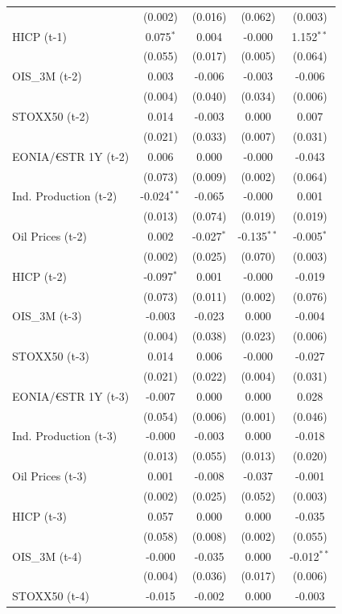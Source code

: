\begin{longtable}[t]{lcccc}
 & (0.002) & (0.016) & (0.062) & (0.003)\\
HICP (t-1) & 0.075$^{*}$ & 0.004 & -0.000 & 1.152$^{**}$\\
 & (0.055) & (0.017) & (0.005) & (0.064)\\
OIS\_3M (t-2) & 0.003 & -0.006 & -0.003 & -0.006\\
 & (0.004) & (0.040) & (0.034) & (0.006)\\
STOXX50 (t-2) & 0.014 & -0.003 & 0.000 & 0.007\\
 & (0.021) & (0.033) & (0.007) & (0.031)\\
EONIA/€STR 1Y (t-2) & 0.006 & 0.000 & -0.000 & -0.043\\
 & (0.073) & (0.009) & (0.002) & (0.064)\\
Ind. Production (t-2) & -0.024$^{**}$ & -0.065 & -0.000 & 0.001\\
 & (0.013) & (0.074) & (0.019) & (0.019)\\
Oil Prices (t-2) & 0.002 & -0.027$^{*}$ & -0.135$^{**}$ & -0.005$^{*}$\\
 & (0.002) & (0.025) & (0.070) & (0.003)\\
HICP (t-2) & -0.097$^{*}$ & 0.001 & -0.000 & -0.019\\
 & (0.073) & (0.011) & (0.002) & (0.076)\\
OIS\_3M (t-3) & -0.003 & -0.023 & 0.000 & -0.004\\
 & (0.004) & (0.038) & (0.023) & (0.006)\\
STOXX50 (t-3) & 0.014 & 0.006 & -0.000 & -0.027\\
 & (0.021) & (0.022) & (0.004) & (0.031)\\
EONIA/€STR 1Y (t-3) & -0.007 & 0.000 & 0.000 & 0.028\\
 & (0.054) & (0.006) & (0.001) & (0.046)\\
Ind. Production (t-3) & -0.000 & -0.003 & 0.000 & -0.018\\
 & (0.013) & (0.055) & (0.013) & (0.020)\\
Oil Prices (t-3) & 0.001 & -0.008 & -0.037 & -0.001\\
 & (0.002) & (0.025) & (0.052) & (0.003)\\
HICP (t-3) & 0.057 & 0.000 & 0.000 & -0.035\\
 & (0.058) & (0.008) & (0.002) & (0.055)\\
OIS\_3M (t-4) & -0.000 & -0.035 & 0.000 & -0.012$^{**}$\\
 & (0.004) & (0.036) & (0.017) & (0.006)\\
STOXX50 (t-4) & -0.015 & -0.002 & 0.000 & -0.003\\

\end{longtable}
